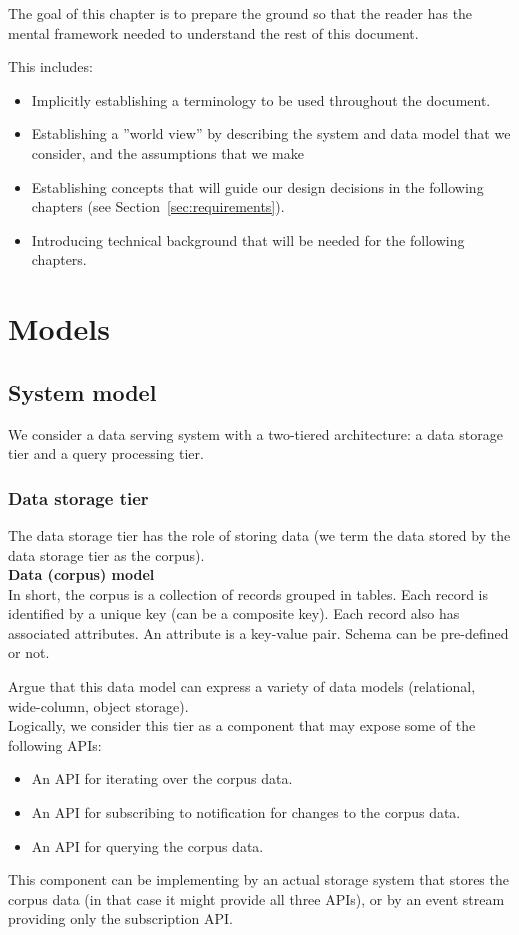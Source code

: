 The goal of this chapter is to prepare the ground so that the reader has the mental framework needed to understand the
rest of this document.

This includes:
\begin{itemize}
  \item Implicitly establishing a terminology to be used throughout the document.
  \item Establishing a ''world view'' by describing the system and data model that we consider, and the assumptions that
  we make
  \item Establishing concepts that will guide our design decisions in the following chapters (see
  Section~\ref{sec:requirements}).
  \item Introducing technical background that will be needed for the following chapters.
\end{itemize}

\section{Models}
\subsection{System model}
We consider a data serving system with a two-tiered architecture: a data storage tier and a query processing tier.


\subsubsection{Data storage tier}
The data storage tier has the role of storing data (we term the data stored by the data storage tier as the corpus). \\

\textbf{Data (corpus) model} \\
In short, the corpus is a collection of records grouped in tables. Each record is identified by a unique key (can be a
composite key).
Each record also has associated attributes. An attribute is a key-value pair. Schema can be pre-defined or not.

Argue that this data model can express a variety of data models (relational, wide-column, object storage). \\

Logically, we consider this tier as a component that may expose some of the following APIs:
\begin{itemize}
  \item An API for iterating over the corpus data.
  \item An API for subscribing to notification for changes to the corpus data.
  \item An API for querying the corpus data.
\end{itemize}
This component can be implementing by an actual storage system that stores the corpus data (in that case it might
provide all three APIs), or by an event stream providing only the subscription API.

